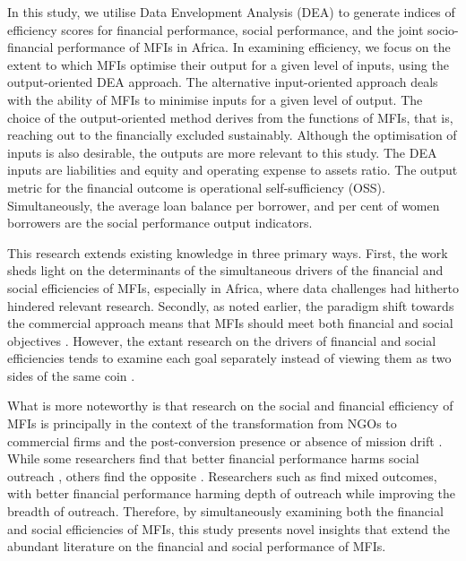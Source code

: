 \documentclass[a4paper, nobind]{templates/ociamthesis}
\begin{document}
In this study, we utilise Data Envelopment Analysis (DEA) to generate indices of efficiency scores for financial performance, social performance, and the joint socio-financial performance of MFIs in Africa. In examining efficiency, we focus on the extent to which MFIs optimise their output for a given level of inputs, using the output-oriented DEA approach. The alternative input-oriented approach deals with the ability of MFIs to minimise inputs for a given level of output. The choice of the output-oriented method derives from the functions of MFIs, that is, reaching out to the financially excluded sustainably. Although the optimisation of inputs is also desirable, the outputs are more relevant to this study. The DEA inputs are liabilities and equity and operating expense to assets ratio. The output metric for the financial outcome is operational self-sufficiency (OSS). Simultaneously, the average loan balance per borrower, and per cent of women borrowers are the social performance output indicators.

This research extends existing knowledge in three primary ways. First, the work sheds light on the determinants of the simultaneous drivers of the financial and social efficiencies of MFIs, especially in Africa, where data challenges had hitherto hindered relevant research. Secondly, as noted earlier, the paradigm shift towards the commercial approach means that MFIs should meet both financial and social objectives \autocite{d2017ngos,chahine2010social}. However, the extant research on the drivers of financial and social efficiencies tends to examine each goal separately instead of viewing them as two sides of the same coin \autocite{efendic2017social,gutierrez2009social}.

What is more noteworthy is that research on the social and financial efficiency of MFIs is principally in the context of the transformation from NGOs to commercial firms and the post-conversion presence or absence of mission drift \autocite{wassie2019performance,d2017ngos,mersland2009performance,mia2017mission,ramus2017}. While some researchers find that better financial performance harms social outreach \autocite{tina2002institutional,kent2013bankers}, others find the opposite \autocite{kar2018changes,abeysekera2014sustainability}. Researchers such as \textcite{leite2019profit} find mixed outcomes, with better financial performance harming depth of outreach while improving the breadth of outreach. Therefore, by simultaneously examining both the financial and social efficiencies of MFIs, this study presents novel insights that extend the abundant literature on the financial and social performance of MFIs.
\end{document}
